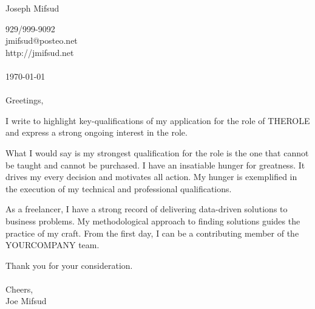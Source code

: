 \documentclass{letter}
\begin{document}
\begin{huge}
\noindent Joseph Mifsud\\
\end{huge}
\begin{large}
929/999-9092\\
jmifsud@posteo.net\\
http://jmifsud.net\\
\\
\today
\\
\\
Greetings,

I write to highlight key-qualifications of my application for the role of THEROLE and express a strong ongoing interest in the role.

What I would say is my strongest qualification for the role is the one that cannot be taught and cannot be purchased. I have an insatiable hunger for greatness. It drives my every decision and motivates all action. My hunger is exemplified in the execution of my technical and professional qualifications.

As a freelancer, I have a strong record of delivering data-driven solutions to business problems. My methodological approach to finding solutions guides the practice of my craft. From the first day, I can be a contributing member of the YOURCOMPANY team.

Thank you for your consideration.\\
\\

Cheers,
\\

Joe Mifsud
\end{large}
\end{document}
